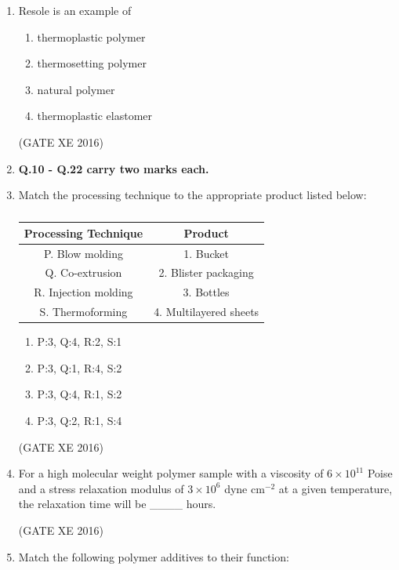 \documentclass[12pt]{article}
\begin{document}
\begin{enumerate}
\item Resole is an example of
\begin{multicols}{2}
\begin{enumerate}
\item thermoplastic polymer 
\item thermosetting polymer 
\item natural polymer 
\item thermoplastic elastomer 
\end{enumerate}
\end{multicols}
(GATE XE 2016)

\item[] \textbf{Q.10 - Q.22 carry two marks each.}

\item Match the processing technique to the appropriate product listed below:  

\begin{table}[H]
\centering
\begin{tabular}{|c|c|}
\hline
\textbf{Processing Technique} & \textbf{Product} \\ \hline
P. Blow molding & 1. Bucket \\ \hline
Q. Co-extrusion & 2. Blister packaging \\ \hline
R. Injection molding & 3. Bottles \\ \hline
S. Thermoforming & 4. Multilayered sheets \\ \hline
\end{tabular}
\caption{}
\label{}
\end{table}

\begin{multicols}{2}
\begin{enumerate}
\item P:3, Q:4, R:2, S:1
\item P:3, Q:1, R:4, S:2
\item P:3, Q:4, R:1, S:2
\item P:3, Q:2, R:1, S:4
\end{enumerate}
\end{multicols}
(GATE XE 2016)

\item For a high molecular weight polymer sample with a viscosity of $6 \times 10^{11}$ Poise and a stress relaxation modulus of $3 \times 10^{6}$ dyne cm$^{-2}$ at a given temperature, the relaxation time will be \_\_\_\_ hours.  

(GATE XE 2016)

\item Match the following polymer additives to their function:  


\end{enumerate}
\end{document}
